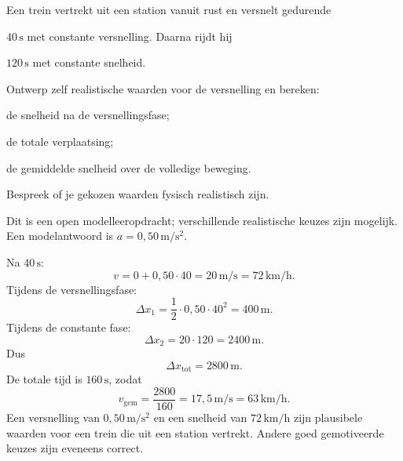 \documentclass{ximera}
\begin{document}
\begin{oefening}{\oefG}

Een trein vertrekt uit een station vanuit rust en versnelt gedurende

$40\,\mathrm{s}$ met constante versnelling. Daarna rijdt hij

$120\,\mathrm{s}$ met constante snelheid.

Ontwerp zelf realistische waarden voor de versnelling en bereken:

\begin{question}

de snelheid na de versnellingsfase;

\end{question}

\begin{question}

de totale verplaatsing;

\end{question}

\begin{question}

de gemiddelde snelheid over de volledige beweging.

\end{question}

Bespreek of je gekozen waarden fysisch realistisch zijn.

\begin{oplossing}
Dit is een open modelleeropdracht; verschillende realistische keuzes zijn mogelijk. Een modelantwoord is \(a=0,50\,\mathrm{m/s^2}\).

Na \(40\,\mathrm{s}\):
\[v=0+0,50\cdot40=20\,\mathrm{m/s}=72\,\mathrm{km/h}.\]
Tijdens de versnellingsfase:
\[\Delta x_1=\frac12\cdot0,50\cdot40^2=400\,\mathrm{m}.\]
Tijdens de constante fase:
\[\Delta x_2=20\cdot120=2400\,\mathrm{m}.\]
Dus
\[\Delta x_{\mathrm{tot}}=2800\,\mathrm{m}.\]
De totale tijd is \(160\,\mathrm{s}\), zodat
\[v_{\mathrm{gem}}=\frac{2800}{160}=17,5\,\mathrm{m/s}=63\,\mathrm{km/h}.\]
Een versnelling van \(0,50\,\mathrm{m/s^2}\) en een snelheid van \(72\,\mathrm{km/h}\) zijn plausibele waarden voor een trein die uit een station vertrekt. Andere goed gemotiveerde keuzes zijn eveneens correct.
\end{oplossing}

\end{oefening}


\end{document}
